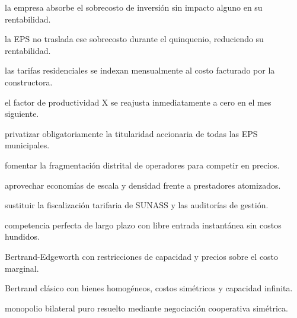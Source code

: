 \begin{opts}
    \item la empresa absorbe el sobrecosto de inversión sin impacto alguno en su rentabilidad.
    \item la EPS no traslada ese sobrecosto durante el quinquenio, reduciendo su rentabilidad.
    \item las tarifas residenciales se indexan mensualmente al costo facturado por la constructora.
    \item el factor de productividad X se reajusta inmediatamente a cero en el mes siguiente.
\end{opts}

\begin{opts}
    \item privatizar obligatoriamente la titularidad accionaria de todas las EPS municipales.
    \item fomentar la fragmentación distrital de operadores para competir en precios.
    \item aprovechar economías de escala y densidad frente a prestadores atomizados.
    \item sustituir la fiscalización tarifaria de SUNASS y las auditorías de gestión.
\end{opts}

\begin{opts}
    \item competencia perfecta de largo plazo con libre entrada instantánea sin costos hundidos.
    \item Bertrand-Edgeworth con restricciones de capacidad y precios sobre el costo marginal.
    \item Bertrand clásico con bienes homogéneos, costos simétricos y capacidad infinita.
    \item monopolio bilateral puro resuelto mediante negociación cooperativa simétrica.
\end{opts}

